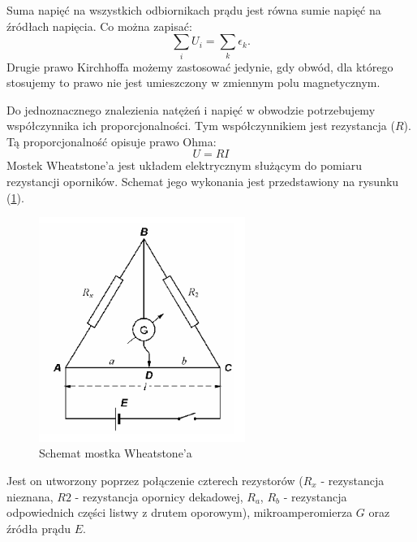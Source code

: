 \documentclass [a4paper,11pt]{article}
\begin{document}
	Suma napięć na wszystkich odbiornikach prądu jest równa sumie napięć na źródłach napięcia. Co można zapisać:
	\begin{equation}
	\label{eq:DPK}
	\sum_{i}U_i=\sum_{k}\epsilon_k \text{.}
	\end{equation}	
	Drugie prawo Kirchhoffa możemy zastosować jedynie, gdy obwód, dla którego stosujemy to prawo nie jest umieszczony w zmiennym polu magnetycznym.
	
	Do jednoznacznego znalezienia natężeń i napięć w obwodzie potrzebujemy współczynnika ich proporcjonalności. Tym współczynnikiem jest rezystancja ($R$). Tą proporcjonalność opisuje prawo Ohma:
	\begin{equation}
	\label{eq:PO}
	U=RI
	\end{equation}
	Mostek Wheatstone'a jest układem elektrycznym służącym do pomiaru rezystancji oporników. Schemat jego wykonania jest przedstawiony na rysunku (\ref{fig:mostek}).
	\begin{figure}[!h]
		\centering
		\includegraphics[width=0.6\textwidth]{mostek}
		\caption{Schemat mostka Wheatstone'a}
		\label{fig:mostek}
	\end{figure}

	Jest on utworzony poprzez połączenie czterech rezystorów ($R_x$ - rezystancja nieznana, $R2$ - rezystancja opornicy dekadowej, $R_a$, $R_b$ - rezystancja odpowiednich części listwy z drutem oporowym), mikroamperomierza $G$ oraz źródła prądu $E$.
	
\end{document}
